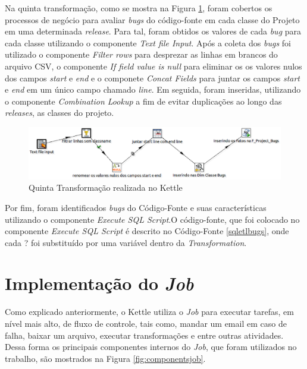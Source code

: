 \begin{apendicesenv}
Na quinta transformação, como se mostra na Figura \ref{fig:quintatransformation}, foram cobertos os processos de negócio para avaliar \textit{bugs} do código-fonte em cada classe do Projeto em uma determinada \textit{release}. Para tal, foram obtidos os valores de cada \textit{bug} para cada classe utilizando o componente \textit{Text file Input}. Após a coleta dos \textit{bugs} foi utilizado o componente \textit{Filter rows} para desprezar as linhas em brancos do arquivo CSV, o componente \textit{If field value is null} para eliminar os os valores nulos dos campos \textit{start} e \textit{end} e o componete \textit{Concat Fields} para juntar os campos \textit{start} e \textit{end} em um único campo chamado \textit{line}. Em seguida, foram inseridas, utilizando o componente \textit{Combination Lookup} a fim de evitar duplicações ao longo das \textit{releases}, as classes do projeto.

\begin{figure}[h!]
\centering
\includegraphics[keepaspectratio=false,scale=0.45]{figuras/figuras_nilton/quintatransformation.eps}
\caption{Quinta Transformação realizada no Kettle}
\label{fig:quintatransformation}
\end{figure}
\FloatBarrier


Por fim, foram identificados \textit{bugs} do Código-Fonte e suas características utilizando o componente \textit{Execute SQL Script}.O código-fonte, que foi colocado no componente \textit{Execute SQL Script} é descrito no Código-Fonte \ref{sqletlbugs}, onde cada ? foi substituído por uma variável dentro da \textit{Transformation}.




\section{Implementação do \textit{Job}}

Como explicado anteriormente, o Kettle utiliza o  \textit{Job} para executar tarefas, em nível mais alto, de fluxo de controle, tais como, mandar um email em caso de falha, baixar um arquivo, executar transformações  e entre outras atividades. Dessa forma os principais componentes internos do \textit{Job}, que foram utilizados no trabalho, são mostrados na Figura \ref{fig:componentsjob}. 


\end{apendicesenv}

